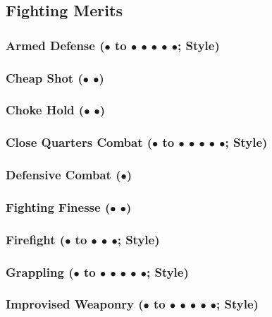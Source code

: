 \documentclass["../Misguided by Starlight.tex"]{subfiles}
\begin{document}
\subsection{Fighting Merits} %
	\subsubsection{Armed Defense ($\bullet$ to $\bullet$ $\bullet$ $\bullet$ $\bullet$ $\bullet$; Style)} %
	
	\subsubsection{Cheap Shot ($\bullet$ $\bullet$)} %
	
	\subsubsection{Choke Hold ($\bullet$ $\bullet$)} %
	
	\subsubsection{Close Quarters Combat ($\bullet$ to $\bullet$ $\bullet$ $\bullet$ $\bullet$ $\bullet$; Style)} %
	
	\subsubsection{Defensive Combat ($\bullet$)} %
	
	\subsubsection{Fighting Finesse ($\bullet$ $\bullet$)} %
	
	\subsubsection{Firefight ($\bullet$ to $\bullet$ $\bullet$ $\bullet$; Style)} %
	
	\subsubsection{Grappling ($\bullet$ to $\bullet$ $\bullet$ $\bullet$ $\bullet$ $\bullet$; Style)} %
	
	\subsubsection{Improvised Weaponry ($\bullet$ to $\bullet$ $\bullet$ $\bullet$ $\bullet$ $\bullet$; Style)} %
	
\end{document}
